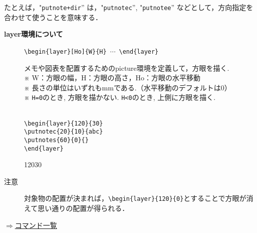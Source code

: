 \documentclass[a4j,12pt,dvipdfmx]{ujarticle}
\newenvironment{cmd}[2]{%
\hypertarget{#2}{}
\begin{center}{\bf\large #1}\end{center}
\begin{description}
}{
\end{description}
\begin{flushright} \hyperlink{functionlist}{$\Rightarrow$コマンド一覧}\end{flushright}
}
\newcommand{\itemketj}[1]{
\item[\Ltab{15mm}{#1}]
}
\newcommand{\Chuu}[1][6.7mm]{%
\Ltab{#1}{}※ %
}
\begin{document}
たとえば，"\verb|putnote+dir|'' は，"\verb|putnotec|'', "\verb|putnotee|'' などとして，方向指定を合わせて使うことを意味する．


\begin{cmd}{layer環境について}{layer}
\itemketj{使用法}\verb|\begin{layer}[Ho]{W}{H}|\ $\cdots$\ \verb|\end{layer}|
\itemketj{説明}メモや図表を配置するためのpicture環境を定義して，方眼を描く.\\
\Chuu W：方眼の幅，H：方眼の高さ，Ho：方眼の水平移動\\
\Chuu 長さの単位はいずれもmmである.（水平移動のデフォルトは0）\\
\Chuu \verb|H=0|のとき, 方眼を描かない. \verb|H<0|のとき, 上側に方眼を描く.

\itemketj{例} \mbox{}\\
\verb|\begin{layer}{120}{30}|\\
\verb|\putnotec{20}{10}{abc}|\\
\verb|\putnotes{60}{0}{}|\\
\verb|\end{layer}|

\vspace{5mm}

\begin{layer}{120}{30}
\end{layer}

\vspace{35mm}

\item[注意]対象物の配置が決まれば，\verb|\begin{layer}{120}{0}|とすることで方眼が消えて思い通りの配置が得られる．
\end{cmd}
\end{document}
